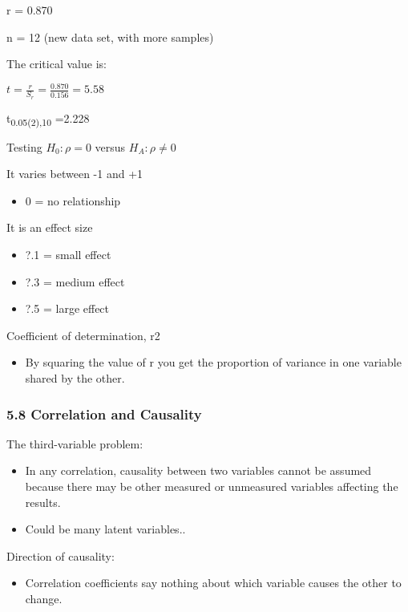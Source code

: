 \documentclass[]{article}
\providecommand{\tightlist}{%
  \setlength{\itemsep}{0pt}\setlength{\parskip}{0pt}}
\begin{document}
r = 0.870

n = 12 (new data set, with more samples)

The critical value is:

\(t=\frac{r}{S_r}= \frac{0.870}{0.156}= 5.58\)

t\textsubscript{0.05(2),10} =2.228

Testing \(H_0: \rho=0\) versus \(H_A: \rho\ne0\)

It varies between -1 and +1

\begin{itemize}
\tightlist
\item
  0 = no relationship
\end{itemize}

It is an effect size

\begin{itemize}
\tightlist
\item
  ?.1 = small effect
\item
  ?.3 = medium effect
\item
  ?.5 = large effect
\end{itemize}

Coefficient of determination, r2

\begin{itemize}
\tightlist
\item
  By squaring the value of r you get the proportion of variance in one
  variable shared by the other.
\end{itemize}

\hypertarget{correlation-and-causality}{%
\subsubsection{5.8 Correlation and
Causality}\label{correlation-and-causality}}

The third-variable problem:

\begin{itemize}
\tightlist
\item
  In any correlation, causality between two variables cannot be assumed
  because there may be other measured or unmeasured variables affecting
  the results.
\item
  Could be many latent variables..
\end{itemize}

Direction of causality:

\begin{itemize}
\tightlist
\item
  Correlation coefficients say nothing about which variable causes the
  other to change.
\end{itemize}
\end{document}
